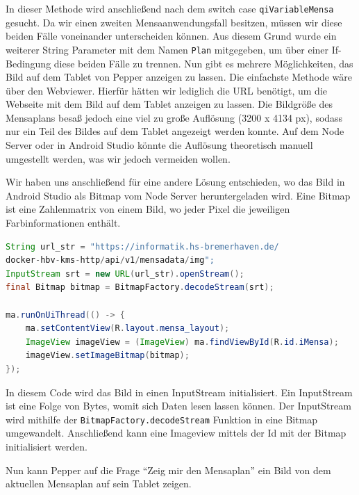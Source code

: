 In dieser Methode wird anschließend nach dem switch 
case \verb|qiVariableMensa| gesucht. Da wir einen zweiten Mensaanwendungsfall besitzen, müssen wir diese beiden Fälle  voneinander unterscheiden können. Aus diesem Grund wurde ein weiterer String Parameter mit dem Namen \verb|Plan| mitgegeben,  um über einer If-Bedingung diese beiden Fälle zu trennen. Nun gibt es mehrere Möglichkeiten, das Bild auf dem Tablet von Pepper anzeigen zu lassen. Die einfachste Methode wäre über den Webviewer. Hierfür hätten wir lediglich die URL benötigt, um die Webseite mit dem Bild auf dem  Tablet anzeigen zu lassen. Die Bildgröße des Mensaplans besaß jedoch eine viel zu große Auflösung (3200 x 4134 px), sodass nur ein Teil des Bildes auf dem Tablet angezeigt werden konnte. Auf dem Node Server oder in Android Studio könnte die Auflösung theoretisch manuell umgestellt werden, was wir jedoch vermeiden wollen. 

Wir haben uns anschließend für eine andere Lösung entschieden, wo das Bild in Android Studio als Bitmap vom Node Server heruntergeladen wird. Eine Bitmap ist eine Zahlenmatrix von einem Bild, wo jeder Pixel die jeweiligen Farbinformationen enthält.\\


\begin{lstlisting}[language=Java, caption={Bitmap im ContentView anzeigen}]
String url_str = "https://informatik.hs-bremerhaven.de/
docker-hbv-kms-http/api/v1/mensadata/img";
InputStream srt = new URL(url_str).openStream();
final Bitmap bitmap = BitmapFactory.decodeStream(srt);
    
ma.runOnUiThread(() -> {
    ma.setContentView(R.layout.mensa_layout);
    ImageView imageView = (ImageView) ma.findViewById(R.id.iMensa);
    imageView.setImageBitmap(bitmap);
});
\end{lstlisting}

In diesem Code wird das Bild in einen InputStream initialisiert. Ein InputStream ist eine Folge von Bytes, womit sich Daten lesen 
lassen können. Der InputStream wird mithilfe der \verb|BitmapFactory.decodeStream| Funktion in eine Bitmap umgewandelt. 
Anschließend kann eine Imageview mittels der Id mit der Bitmap initialisiert werden. 

Nun kann Pepper auf die Frage ``Zeig mir den Mensaplan'' ein Bild von dem aktuellen Mensaplan auf sein Tablet zeigen. \\

